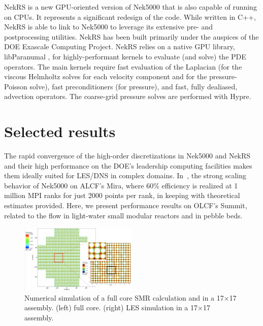 \documentclass{anstrans}
\begin{document}
\medskip
NekRS is a new GPU-oriented version of Nek5000  that is also capable of running
on CPUs. It represents a significant redesign of the code. While written in
C++, NekRS is able to link to Nek5000 to leverage its extensive pre- and
postprocessing utilities. NekRS has been built primarily under the auspices of
the DOE Exascale Computing Project.  NekRS relies on a native GPU library,
libParanumal \cite{libP}, for highly-performant kernels to evaluate (and
solve) the PDE operators.  The main kernels require fast evaluation of the 
Laplacian (for the viscous Helmholtz solves for each velocity component and
for the pressure-Poisson solve), fast preconditioners (for pressure), and
fast, fully dealiased, advection operators.  The coarse-grid pressure solves
are performed with Hypre.


\section{Selected results}

The rapid convergence of the high-order discretizations in Nek5000 and NekRS
and their high performance on the DOE's leadership computing facilities makes
them ideally suited for LES/DNS in complex domains.  
In~\cite{fischer15}, the strong scaling behavior of Nek5000 on ALCF's Mira, 
where 60\% efficiency is realized at 1 million MPI ranks for just 2000 points 
per rank, in keeping with theoretical estimates provided.  
Here, we present performance results on OLCF's Summit,
related to the flow in light-water small modular reactors and in pebble beds.

\begin{figure}[!ht]
\centering
\includegraphics[width=0.5\textwidth]{./Figures/full_core_summary.png}
\caption{Numerical simulation of a full core SMR calculation and in a 17$\times$17 assembly.
  (left) full core. (right) LES simulation in a 17$\times$17 assembly.}
\label{fig:gpu2}
\end{figure}
\end{document}
